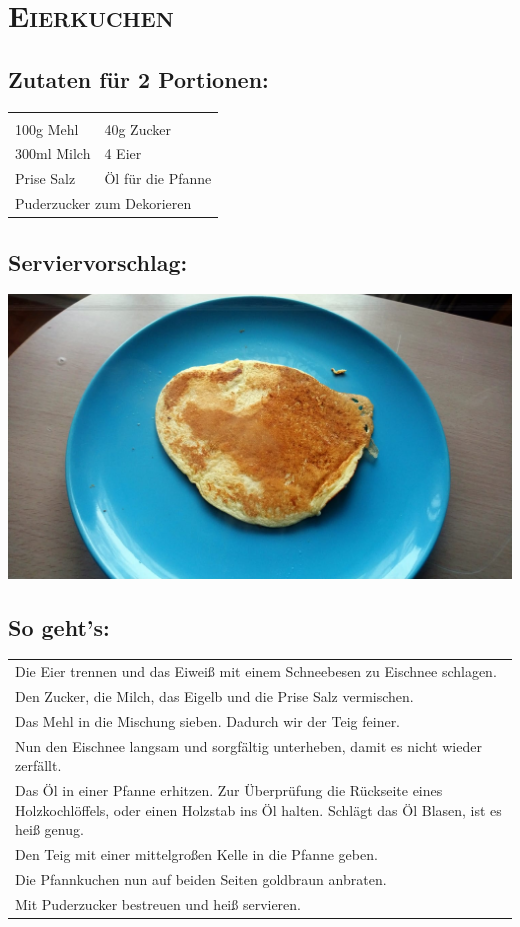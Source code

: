 \section{\textsc{Eierkuchen}}

\subsection*{Zutaten für 2 Portionen:}

\begin{tabular}{p{7.5cm} p{7.5cm}}
	& \\
	100g Mehl & 40g Zucker \\
	300ml Milch & 4 Eier \\
	Prise Salz & Öl für die Pfanne \\
	\multicolumn{2}{l}{Puderzucker zum Dekorieren}
\end{tabular}

\subsection*{Serviervorschlag:}

\includegraphics[width=\textwidth]{img/pancakes/pancakes_gebraten.jpg}

\subsection*{So geht's:}

\begin{tabular}{p{15cm}}
	\\
	Die Eier trennen und das Eiweiß mit einem Schneebesen zu Eischnee schlagen.\\
	Den Zucker, die Milch, das Eigelb und die Prise Salz vermischen.\\
	Das Mehl in die Mischung sieben. Dadurch wir der Teig feiner.\\
	Nun den Eischnee langsam und sorgfältig unterheben, damit es nicht wieder zerfällt.\\
	Das Öl in einer Pfanne erhitzen. Zur Überprüfung die Rückseite eines Holzkochlöffels, oder einen Holzstab ins Öl halten. Schlägt das Öl Blasen, ist es heiß genug.\\
	Den Teig mit einer mittelgroßen Kelle in die Pfanne geben.\\
	Die Pfannkuchen nun auf beiden Seiten goldbraun anbraten.\\
	Mit Puderzucker bestreuen und heiß servieren.
\end{tabular}
